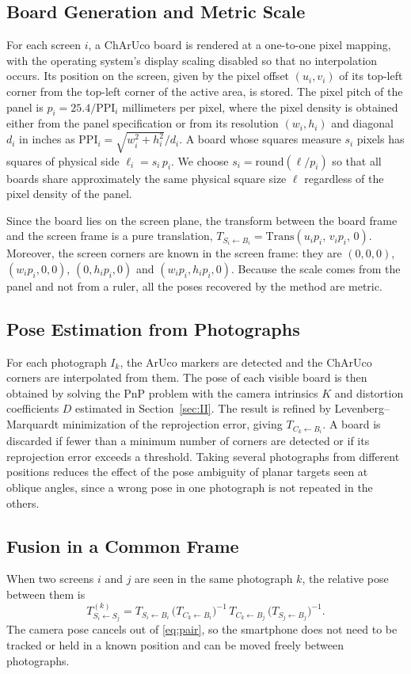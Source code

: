 \documentclass[english,hidelinks]{sbrt}
\begin{document}
\subsection{Board Generation and Metric Scale}
For each screen $i$, a ChArUco board is rendered at a one-to-one pixel mapping, with the operating system's display scaling disabled so that no interpolation occurs. Its position on the screen, given by the pixel offset $(u_i, v_i)$ of its top-left corner from the top-left corner of the active area, is stored. The pixel pitch of the panel is $p_i = 25.4/\mathrm{PPI}_i$ millimeters per pixel, where the pixel density is obtained either from the panel specification or from its resolution $(w_i, h_i)$ and diagonal $d_i$ in inches as $\mathrm{PPI}_i = \sqrt{w_i^2 + h_i^2}/d_i$. A board whose squares measure $s_i$ pixels has squares of physical side $\ell_i = s_i\,p_i$. We choose $s_i = \mathrm{round}(\ell/p_i)$ so that all boards share approximately the same physical square size $\ell$ regardless of the pixel density of the panel.

Since the board lies on the screen plane, the transform between the board frame and the screen frame is a pure translation, $T_{S_i\leftarrow B_i} = \mathrm{Trans}(u_i p_i,\, v_i p_i,\, 0)$. Moreover, the screen corners are known in the screen frame: they are $(0,0,0)$, $(w_i p_i, 0, 0)$, $(0, h_i p_i, 0)$ and $(w_i p_i, h_i p_i, 0)$. Because the scale comes from the panel and not from a ruler, all the poses recovered by the method are metric.

\subsection{Pose Estimation from Photographs}
For each photograph $I_k$, the ArUco markers are detected and the ChArUco corners are interpolated from them. The pose of each visible board is then obtained by solving the PnP problem with the camera intrinsics $K$ and distortion coefficients $D$ estimated in Section~\ref{sec:II}. The result is refined by Levenberg--Marquardt minimization of the reprojection error, giving $T_{C_k\leftarrow B_i}$. A board is discarded if fewer than a minimum number of corners are detected or if its reprojection error exceeds a threshold. Taking several photographs from different positions reduces the effect of the pose ambiguity of planar targets seen at oblique angles, since a wrong pose in one photograph is not repeated in the others.

\subsection{Fusion in a Common Frame}
When two screens $i$ and $j$ are seen in the same photograph $k$, the relative pose between them is
\begin{equation}
T^{(k)}_{S_i\leftarrow S_j} = T_{S_i\leftarrow B_i}\,\big(T_{C_k\leftarrow B_i}\big)^{-1}\,T_{C_k\leftarrow B_j}\,\big(T_{S_j\leftarrow B_j}\big)^{-1}.
\label{eq:pair}
\end{equation}
The camera pose cancels out of \eqref{eq:pair}, so the smartphone does not need to be tracked or held in a known position and can be moved freely between photographs.
\end{document}
